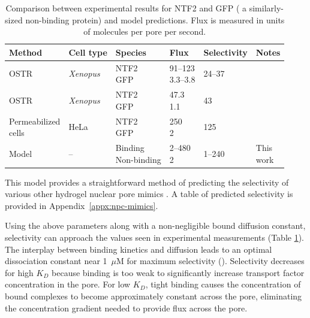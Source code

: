 \begin{table}[b]
  \caption[Comparison between flux measurements and model predictions.]{Comparison between experimental results for NTF2 and GFP ( a similarly-sized non-binding protein) and model
    predictions. Flux is measured in units of molecules per pore per
    second.}
    \label{table:NTF2-flux}
    \begin{tabular}{p{2.3cm}p{1.4cm}p{2cm}p{1.3cm}p{1.8cm}p{0.8cm}}
      Method & Cell type & Species & Flux & Selectivity & Notes\\
      \hline
      OSTR & \textit{Xenopus} & \makecell[cl]{NTF2\\GFP} & \makecell[cl]{91--123\\3.3--3.8} & 24--37 
                         &\cite{siebrasse02}
      \\
      OSTR & \textit{Xenopus} & \makecell[cl]{NTF2\\GFP} & \makecell[cl]{47.3\\1.1} & 43 &  \cite{kiskin03}\\
      \makecell[cl]{Permeabilized \\ cells}  & HeLa &
                                                    \makecell[cl]{NTF2\\GFP} & \makecell[cl]{250\\2} & 125 & \cite{ribbeck01}\\
      Model & -- & \makecell[cl]{Binding\\Non-binding} & \makecell[cl]{2--480\\2} & 1--240 & \makecell[cl]{This\\work}\\ \hline
    \end{tabular}
\end{table}

This model provides a straightforward method of predicting the selectivity of various other hydrogel nuclear pore mimics \cite{frey09,ader10,frey07,kim15}.  A table of predicted selectivity is provided in Appendix~\ref{appx:npc-mimics}.

Using the above parameters along with a non-negligible bound diffusion constant, selectivity can approach the values seen in experimental measurements (Table \ref{table:NTF2-flux}).  The interplay between binding kinetics and diffusion leads to an optimal dissociation constant near 1~$\mu$M for maximum selectivity (). Selectivity decreases for high $K_D$ because binding is too weak to
significantly increase transport factor concentration in the pore.  For low $K_D$, tight binding causes the concentration of bound complexes to become approximately constant across the pore, eliminating the concentration gradient needed to provide flux across the pore.

